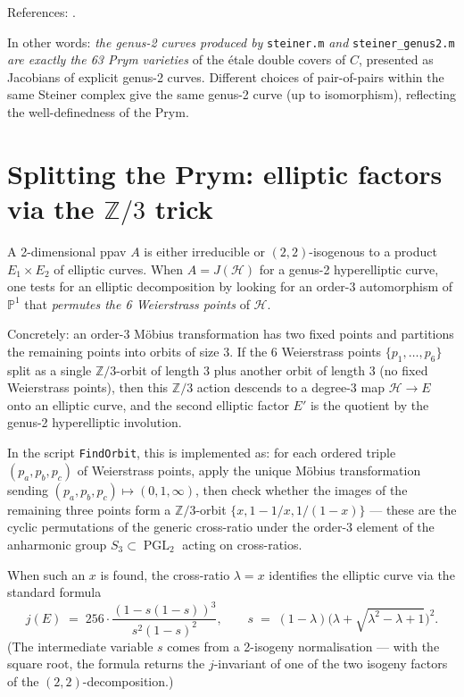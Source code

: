 \documentclass[11pt]{amsart}
\theoremstyle{plain}
\theoremstyle{definition}
\theoremstyle{remark}
\newcommand{\PGL}{\operatorname{PGL}}
\newcommand{\Pp}{\mathbb P}
\newcommand{\Z}{\mathbb Z}
\newcommand{\Hh}{\mathcal H}
\begin{document}
References: \cite{Wirtinger1895,Recillas1974,Beauville1977,Verra1987,Dolgachev2012}.

In other words: \emph{the genus-2 curves produced by} \texttt{steiner.m}
\emph{and} \texttt{steiner\_genus2.m} \emph{are exactly the 63 Prym varieties}
of the \'etale double covers of $C$, presented as Jacobians of explicit
genus-2 curves. Different choices of pair-of-pairs within the same Steiner
complex give the same genus-2 curve (up to isomorphism), reflecting the
well-definedness of the Prym.

\section{Splitting the Prym: elliptic factors via the $\Z/3$ trick}
\label{sec:elliptic-factors}

A 2-dimensional ppav $A$ is either irreducible or $(2,2)$-isogenous to a
product $E_1 \times E_2$ of elliptic curves. When $A = J(\Hh)$ for a
genus-2 hyperelliptic curve, one tests for an elliptic decomposition by
looking for an order-3 automorphism of $\Pp^1$ that \emph{permutes the 6
Weierstrass points} of $\Hh$.

Concretely: an order-3 M\"obius transformation has two fixed points and
partitions the remaining points into orbits of size $3$. If the 6 Weierstrass
points $\{p_1, \ldots, p_6\}$ split as a single $\Z/3$-orbit of length 3
plus another orbit of length 3 (no fixed Weierstrass points), then this
$\Z/3$ action descends to a degree-3 map $\Hh \to E$ onto an elliptic curve,
and the second elliptic factor $E'$ is the quotient by the genus-2
hyperelliptic involution.

In the script \texttt{FindOrbit}, this is implemented as: for each ordered
triple $(p_a, p_b, p_c)$ of Weierstrass points, apply the unique M\"obius
transformation sending $(p_a, p_b, p_c) \mapsto (0, 1, \infty)$, then check
whether the images of the remaining three points form a $\Z/3$-orbit
$\{x, 1 - 1/x, 1/(1 - x)\}$ --- these are the cyclic permutations of the
generic cross-ratio under the order-3 element of the anharmonic group
$S_3 \subset \PGL_2$ acting on cross-ratios.

When such an $x$ is found, the cross-ratio $\lambda = x$ identifies the
elliptic curve via the standard formula
\[
  j(E) \;=\; 256 \cdot \frac{(1 - s(1-s))^3}{s^2 (1-s)^2},
  \qquad
  s \;=\; (1 - \lambda) \bigl(\lambda + \sqrt{\lambda^2 - \lambda + 1}\bigr)^2.
\]
(The intermediate variable $s$ comes from a 2-isogeny normalisation --- with
the square root, the formula returns the $j$-invariant of one of the two
isogeny factors of the $(2,2)$-decomposition.)
\end{document}
